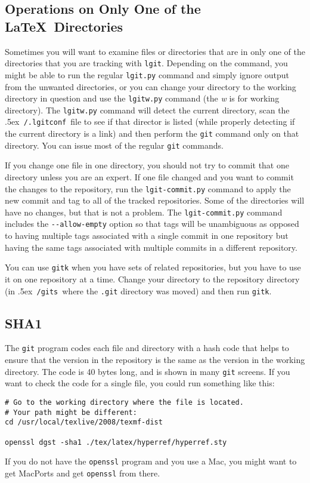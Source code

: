 \documentclass{ltxdoc}
\def\bobtilde{\lower.5ex\hbox{\tt \string~}}%
\def\ucmd#1{{\tt {#1}}}
\def\lgitconf{\bobtilde\ucmd{/.lgitconf}}
\def\mygits{\bobtilde\ucmd{/gits}}
\begin{document}
\subsection{Operations on Only One of the \LaTeX\ Directories}
Sometimes you will want to examine files or directories that are in only one of the directories that you are tracking with \ucmd{lgit}.  Depending on the command, you might be able to run the regular \ucmd{lgit.py} command and simply ignore output from the unwanted directories, or you can change your directory to the working directory in question and use the \ucmd{lgitw.py} command (the \emph{w} is for working directory).  The \ucmd{lgitw.py} command will detect the current directory, scan the \lgitconf\ file to see if that director is listed (while properly detecting if the current directory is a link) and then perform the \ucmd{git} command only on that directory.  You can issue most of the regular \ucmd{git} commands.

If you change one file in one directory, you should not try to commit that one directory unless you are an expert.  If one file changed and you want to commit the changes to the repository, run the \ucmd{lgit-commit.py} command to apply the new commit and tag to all of the tracked repositories. Some of the directories will have no changes, but that is not a problem. The \ucmd{lgit-commit.py} command includes the \verb|--allow|\ucmd{-empty} option so that tags will be unambiguous as opposed to having multiple tags associated with a single commit in one repository but having the same tags associated with multiple commits in a different repository.

You can use \ucmd{gitk} when you have sets of related repositories, but you have to use it on one repository at a time.  Change your directory to the repository directory (in \mygits\ where the \ucmd{.git} directory was moved) and then run \ucmd{gitk}.

\subsection{SHA1}
The \ucmd{git} program codes each file and directory with a hash code that helps to ensure that the version in the repository is the same as the version in the working directory.  The code is 40 bytes long, and is shown in many \ucmd{git} screens. If you want to check the code for a single file, you could run something like this:
\begin{verbatim}
# Go to the working directory where the file is located.
# Your path might be different:
cd /usr/local/texlive/2008/texmf-dist

openssl dgst -sha1 ./tex/latex/hyperref/hyperref.sty 
\end{verbatim}
If you do not have the \ucmd{openssl} program and you use a Mac, you might want to get MacPorts and get \ucmd{openssl} from there.
\end{document}
